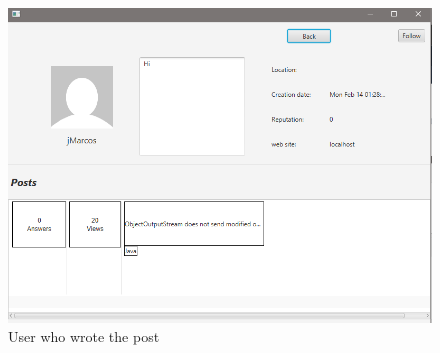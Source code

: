 \documentclass[11pt]{report}
\begin{document}
\begin{figure}[H]
  \centering
  \includegraphics[width=\textwidth,keepaspectratio=true]{img/user_manual/ContextMenuPost2.png}
  \caption{User who wrote the post}
  \label{fig:ContextMenuPost2}
\end{figure}
\end{document}
